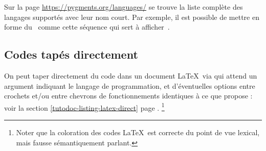 \documentclass{../main/main}
\begin{document}
\medskip

\begin{tdocnote}
	Sur la page \url{https://pygments.org/languages/} se trouve la liste complète des langages supportés avec leur nom court.
	Par exemple, il est possible de mettre en forme du \brainfuck\ comme cette séquence  qui sert à afficher \,.
\end{tdocnote}



\subsection{Codes tapés directement}

On peut taper directement du code dans un document \LaTeX\ via  qui attend un argument indiquant le langage de programmation, et d'éventuelles options entre crochets et/ou entre chevrons de fonctionnements identiques à ce que propose  : voir la section \ref{tutodoc-listing-latex-direct} page \pageref{tutodoc-listing-latex-direct}.%
\footnote{
	Noter que la coloration des codes \LaTeX\ est correcte du point de vue lexical, mais fausse sémantiquement parlant.
}


\begin{tdocexa}
	\leavevmode
\end{tdocexa}


\begin{tdocexa}
	\leavevmode
\end{tdocexa}
\end{document}
